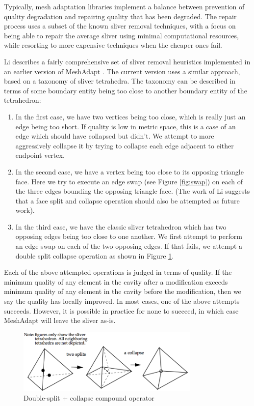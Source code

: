 Typically, mesh adaptation libraries implement a balance
between prevention of quality degradation and repairing
quality that has been degraded.
The repair process uses a subset of the known sliver removal
techniques, with a focus on being able to repair the average
sliver using minimal computational resources, while resorting
to more expensive techniques when the cheaper ones fail.

Li describes a fairly comprehensive set of sliver removal
heuristics implemented in an earlier version of MeshAdapt
\cite{li2003mesh}.
The current version uses a similar approach, based on a
taxonomy of sliver tetrahedra.
The taxonomy can be described in terms of some boundary
entity being too close to another boundary entity
of the tetrahedron:
\begin{enumerate}
\item In the first case, we have two vertices being too
close, which is really just an edge being too short.
If quality is low in metric space, this is a case
of an edge which should have collapsed but didn't.
We attempt to more aggressively collapse it by trying
to collapse each edge adjacent to either endpoint vertex.
\item In the second case, we have a vertex being too close
to its opposing triangle face.
Here we try to execute an edge swap (see Figure \ref{fig:swap})
on each of the three edges bounding the opposing triangle face.
(The work of Li suggests that a face split and collapse operation
should also be attempted as future work).
\item In the third case, we have the classic sliver tetrahedron
which has two opposing edges being too close to one another.
We first attempt to perform an edge swap on each of the two
opposing edges.
If that fails, we attempt a double split collapse operation
as shown in Figure \ref{fig:compound}.
\end{enumerate}
Each of the above attempted operations is judged in terms of quality.
If the minimum quality of any element in the cavity after a modification
exceeds minimum quality of any element in the cavity before the
modification, then we say the quality has locally improved.
In most cases, one of the above attempts succeeds.
However, it is possible in practice for none to succeed, in which
case MeshAdapt will leave the sliver as-is.

\begin{figure}
\begin{center}
\includegraphics[width=0.8\textwidth]{split_collapse.png}
\caption{Double-split + collapse compound operator
\cite{li2003mesh}}
\label{fig:compound}
\end{center}
\end{figure}

